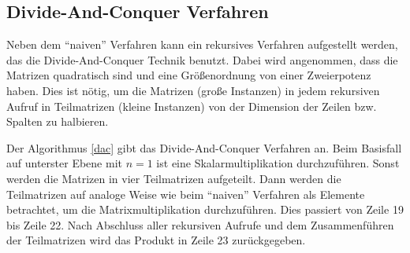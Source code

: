\subsection{Divide-And-Conquer Verfahren}

Neben dem \enquote{naiven} Verfahren kann ein rekursives Verfahren aufgestellt werden, das die Divide-And-Conquer Technik benutzt. Dabei wird angenommen, dass die Matrizen quadratisch sind und eine Größenordnung von einer Zweierpotenz haben. Dies ist nötig, um die Matrizen (große Instanzen) in jedem rekursiven Aufruf in Teilmatrizen (kleine Instanzen) von der Dimension der Zeilen bzw. Spalten zu halbieren. 

Der Algorithmus \ref{dac} gibt das Divide-And-Conquer Verfahren an. Beim Basisfall auf unterster Ebene mit $n = 1$ ist eine Skalarmultiplikation durchzuführen. Sonst werden die Matrizen in vier Teilmatrizen aufgeteilt. Dann werden die Teilmatrizen auf analoge Weise wie beim \enquote{naiven} Verfahren als Elemente betrachtet, um die Matrixmultiplikation durchzuführen. Dies passiert von Zeile 19 bis Zeile 22. Nach Abschluss aller rekursiven Aufrufe und dem Zusammenführen der Teilmatrizen wird das Produkt in Zeile 23 zurückgegeben.

